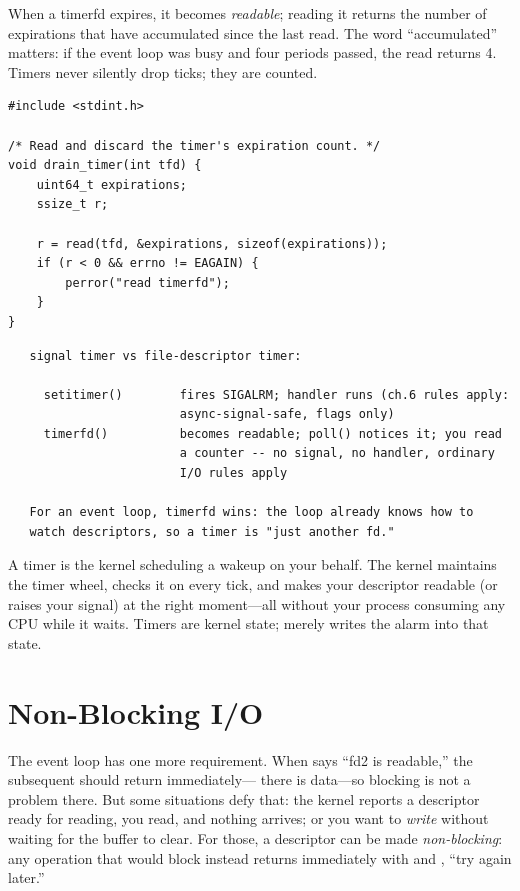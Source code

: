 When a timerfd expires, it becomes \emph{readable}; reading it returns
the number of expirations that have accumulated since the last read.
The word ``accumulated'' matters: if the event loop was busy and four
periods passed, the read returns 4. Timers never silently drop ticks;
they are counted.

\begin{lstlisting}[caption={Drain the timer's accumulated expirations.}]
#include <stdint.h>

/* Read and discard the timer's expiration count. */
void drain_timer(int tfd) {
    uint64_t expirations;
    ssize_t r;

    r = read(tfd, &expirations, sizeof(expirations));
    if (r < 0 && errno != EAGAIN) {
        perror("read timerfd");
    }
}
\end{lstlisting}

\begin{verbatim}
   signal timer vs file-descriptor timer:

     setitimer()        fires SIGALRM; handler runs (ch.6 rules apply:
                        async-signal-safe, flags only)
     timerfd()          becomes readable; poll() notices it; you read
                        a counter -- no signal, no handler, ordinary
                        I/O rules apply

   For an event loop, timerfd wins: the loop already knows how to
   watch descriptors, so a timer is "just another fd."
\end{verbatim}

\begin{osconcept}
A timer is the kernel scheduling a wakeup on your behalf. The kernel
maintains the timer wheel, checks it on every tick, and makes your
descriptor readable (or raises your signal) at the right moment---all
without your process consuming any CPU while it waits. Timers are
kernel state;  merely writes the alarm into
that state.
\end{osconcept}

\section{Non-Blocking I/O}

The event loop has one more requirement. When  says ``fd2
is readable,'' the subsequent  should return immediately---
there is data---so blocking is not a problem there. But some situations
defy that: the kernel reports a descriptor ready for reading, you read,
and nothing arrives; or you want to \emph{write} without waiting for
the buffer to clear. For those, a descriptor can be made
\emph{non-blocking}: any operation that would block instead returns
immediately with  and , ``try again
later.''

